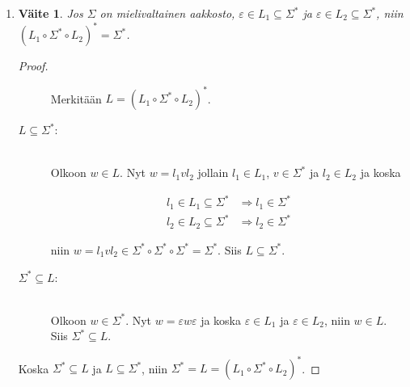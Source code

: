 \documentclass[a4paper,11pt,draft]{article}
\newtheorem*{claim}{Väite}
\begin{document}
\begin{enumerate}
\begin{enumerate}
\begin{proof}
\begin{description}
\begin{itemize}
\begin{itemize}
          \end{itemize}
        \end{itemize}
      \end{description}

      Olkoon sitten $w \in A$. Nyt $w = u_1 \ldots u_n$ missä $u_i \in
      \{a, b\}$ kaikilla $i$. Siten $w \in \{a,b\}^*$.

      On siis osoitettu, että $\{a,b\}^* \subseteq A$ ja $A \subseteq
      \{a,b\}^*$ joten joukot ovat samat.
    \end{proof}

  \item
    \begin{claim}
      Jos $\Sigma$ on mielivaltainen aakkosto, $\varepsilon \in L_1 \subseteq
      \Sigma^*$ ja $\varepsilon \in L_2 \subseteq \Sigma^*$, niin $(L_1 \circ
      \Sigma^* \circ L_2)^* = \Sigma^*$.
    \end{claim}

    \begin{proof}
      \begin{description}
      \item[]Merkitään $L = (L_1 \circ \Sigma^* \circ L_2)^*$.

      \item[$L \subseteq \Sigma^*$:]
        \hfill \\
        Olkoon $w \in L$. Nyt $w = l_1vl_2$ jollain $l_1 \in L_1$,
        $v \in \Sigma^*$ ja $l_2 \in L_2$ ja koska

        \begin{align*}
          l_1 \in L_1 \subseteq \Sigma^* &\Rightarrow l_1 \in
          \Sigma^* \\
          l_2 \in L_2 \subseteq \Sigma^* &\Rightarrow l_2 \in
          \Sigma^*
        \end{align*}

        niin $w = l_1vl_2 \in \Sigma^* \circ \Sigma^* \circ \Sigma^*
        = \Sigma^*$. Siis $L \subseteq \Sigma^*$.

      \item[$\Sigma^* \subseteq L$:]
        \hfill \\
        Olkoon $w \in \Sigma^*$. Nyt $w = \varepsilon w \varepsilon$
        ja koska $\varepsilon \in L_1$ ja $\varepsilon \in L_2$,
        niin $w \in L$. Siis $\Sigma^* \subseteq L$.
      \end{description}

      Koska $\Sigma^* \subseteq L$ ja $L \subseteq \Sigma^*$, niin
      $\Sigma^* = L = (L_1 \circ \Sigma^* \circ L_2)^*$.
    \end{proof}


\end{enumerate}
\end{enumerate}
\end{document}
